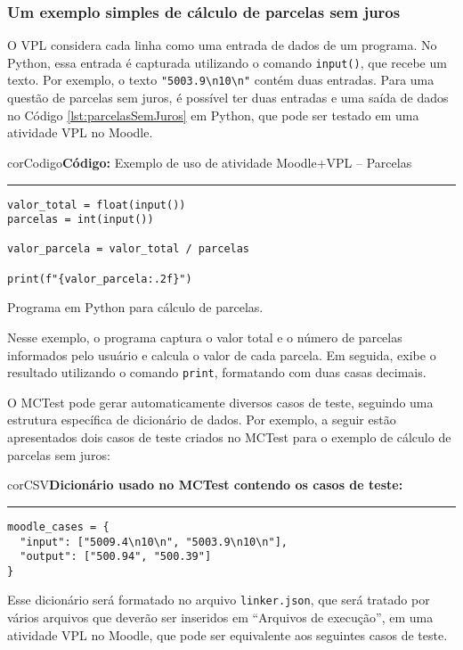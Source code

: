 \subsubsection{Um exemplo simples de cálculo de parcelas sem juros}

O VPL considera cada linha como uma entrada de dados de um programa. No Python, essa entrada é capturada utilizando o comando \verb|input()|, que recebe um texto. Por exemplo, o texto \verb|"5003.9\n10\n"| contém duas entradas. Para uma questão de parcelas sem juros, é possível ter duas entradas e uma saída de dados no Código \ref{lst:parcelasSemJuros} em Python, que pode ser testado em uma atividade VPL no Moodle.
%
\begin{listing}[!ht]
\begin{myboxCode}{corCodigo}{\textbf{Código: } Exemplo de uso de atividade Moodle+VPL -- Parcelas}\vspace{3mm}
\hrule
\begin{verbatim}
valor_total = float(input())
parcelas = int(input())

valor_parcela = valor_total / parcelas

print(f"{valor_parcela:.2f}")
\end{verbatim}
\end{myboxCode}
\caption{Programa em Python para cálculo de parcelas.}
\label{lst:parcelasSemJuros}
\end{listing}
%
Nesse exemplo, o programa captura o valor total e o número de parcelas informados pelo usuário e calcula o valor de cada parcela. Em seguida, exibe o resultado utilizando o comando \verb|print|, formatando com duas casas decimais.

O MCTest pode gerar automaticamente diversos casos de teste, seguindo uma estrutura específica de dicionário de dados. Por exemplo, a seguir estão apresentados dois casos de teste criados no MCTest para o exemplo de cálculo de parcelas sem juros:

\begin{myboxCode}{corCSV}{\textbf{Dicionário usado no MCTest contendo os casos de teste:}}\vspace{3mm}
\hrule
\begin{verbatim}
moodle_cases = {
  "input": ["5009.4\n10\n", "5003.9\n10\n"],
  "output": ["500.94", "500.39"]
}
\end{verbatim}
\end{myboxCode}

Esse dicionário será formatado no arquivo \verb|linker.json|, que será tratado por vários arquivos que deverão ser inseridos em ``Arquivos de execução'', em uma atividade VPL no Moodle, que pode ser equivalente aos seguintes casos de teste.

